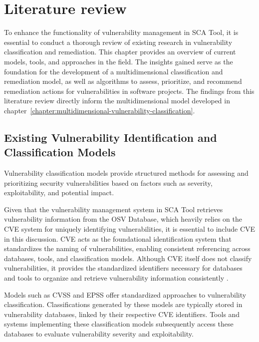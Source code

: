 \chapter{Literature review}
\label{chapter:literature-review}

To enhance the functionality of vulnerability management in \ac{SCA} Tool, it is essential to conduct a thorough review of existing research in vulnerability classification and remediation. This chapter provides an overview of current models, tools, and approaches in the field. The insights gained serve as the foundation for the development of a multidimensional classification and remediation model, as well as algorithms to assess, prioritize, and recommend remediation actions for vulnerabilities in software projects. The findings from this literature review directly inform the multidimensional model developed in chapter~\ref{chapter:multidimensional-vulnerability-classification}.

\section{Existing Vulnerability Identification and Classification Models}
\label{sec:existing-vulnerability-identification}

Vulnerability classification models provide structured methods for assessing and prioritizing security vulnerabilities based on factors such as severity, exploitability, and potential impact.

Given that the vulnerability management system in \ac{SCA} Tool retrieves vulnerability information from the \ac{OSV} Database, which heavily relies on the \ac{CVE} system for uniquely identifying vulnerabilities, it is essential to include \ac{CVE} in this discussion. \ac{CVE} acts as the foundational identification system that standardizes the naming of vulnerabilities, enabling consistent referencing across databases, tools, and classification models. Although \ac{CVE} itself does not classify vulnerabilities, it provides the standardized identifiers necessary for databases and tools to organize and retrieve vulnerability information consistently \autocite{mitre_corporation_overview_2024}.

Models such as \ac{CVSS} and \ac{EPSS} offer standardized approaches to vulnerability classification. Classifications generated by these models are typically stored in vulnerability databases, linked by their respective \ac{CVE} identifiers. Tools and systems implementing these classification models subsequently access these databases to evaluate vulnerability severity and exploitability.

